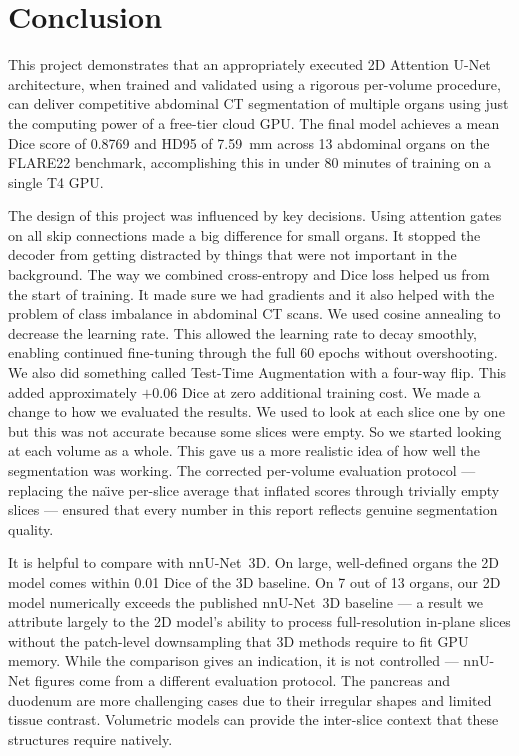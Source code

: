 \chapter{Conclusion}
\label{chap:conc}

This project demonstrates that an appropriately executed 2D Attention U-Net architecture, when trained and validated using a rigorous per-volume procedure, can deliver competitive abdominal CT segmentation of multiple organs using just the computing power of a free-tier cloud GPU. The final model achieves a mean Dice score of 0.8769 and HD95 of 7.59~mm across 13 abdominal organs on the FLARE22 benchmark, accomplishing this in under 80 minutes of training on a single T4 GPU.

The design of this project was influenced by key decisions. Using attention gates on all skip connections made a big difference for small organs. It stopped the decoder from getting distracted by things that were not important in the background. The way we combined cross-entropy and Dice loss helped us from the start of training. It made sure we had gradients and it also helped with the problem of class imbalance in abdominal CT scans. We used cosine annealing to decrease the learning rate. This allowed the learning rate to decay smoothly, enabling continued fine-tuning through the full 60 epochs without overshooting. We also did something called Test-Time Augmentation with a four-way flip. This added approximately $+$0.06 Dice at zero additional training cost. We made a change to how we evaluated the results. We used to look at each slice one by one but this was not accurate because some slices were empty. So we started looking at each volume as a whole. This gave us a more realistic idea of how well the segmentation was working. The corrected per-volume evaluation protocol --- replacing the na\"\i{}ve per-slice average that inflated scores through trivially empty slices --- ensured that every number in this report reflects genuine segmentation quality.

It is helpful to compare with nnU-Net~3D. On large, well-defined organs the 2D model comes within 0.01 Dice of the 3D baseline. On 7 out of 13 organs, our 2D model numerically exceeds the published nnU-Net~3D baseline --- a result we attribute largely to the 2D model's ability to process full-resolution in-plane slices without the patch-level downsampling that 3D methods require to fit GPU memory. While the comparison gives an indication, it is not controlled --- nnU-Net figures come from a different evaluation protocol. The pancreas and duodenum are more challenging cases due to their irregular shapes and limited tissue contrast. Volumetric models can provide the inter-slice context that these structures require natively.

